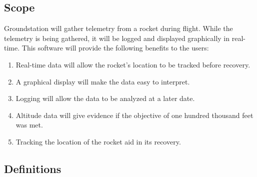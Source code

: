 \documentclass[10pt,journal,draftclsnofoot,onecolumn]{IEEEtran}
\begin{document}
	\subsection{Scope}
	Groundstation will gather telemetry from a rocket during flight.
	While the telemetry is being gathered, it will be logged and displayed graphically in real-time.
	This software will provide the following benefits to the users:
	\begin{enumerate}
		\item Real-time data will allow the rocket's location to be tracked before recovery.
		\item A graphical display will make the data easy to interpret.
		\item Logging will allow the data to be analyzed at a later date.
		\item Altitude data will give evidence if the objective of one hundred thousand feet was met.
		\item Tracking the location of the rocket aid in its recovery.
	\end{enumerate}	
			
	\subsection{Definitions}
	
\end{document}

